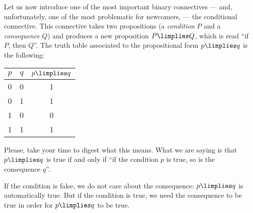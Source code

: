 \begin{para}
Let us now introduce one of the most important binary connectives --- and, unfortunately, one of the most problematic for newcomers, --- the conditional connective.
This connective takes two propositions (a \emph{condition} $P$ and a \emph{consequence} $Q$) and produces a new proposition $P\limplies Q$, which is read ``if $P$, then $Q$''.
The truth table associated to the propositional form $p\limplies q$  is the following:
\begin{center}
\begin{tabular}[]{|c|c||c|}
\hline $p$ & $q$ & $p\limplies q$ \\
\hline\hline 0 & 0 & 1 \\
\hline 0 & 1 & 1 \\
\hline 1 & 0 & 0 \\
\hline 1 & 1 & 1 \\
\hline
\end{tabular}
\end{center}
Please, take your time to digest what this means. What we are saying is that $p\limplies q$ is true if and only if ``if the condition $p$ is true, so is the consequence $q$''.

If the condition is false, we do not care about the consequence: $p\limplies q$ is automatically true.
But if the condition is true, we need the consequence to be true in order for $p\limplies q$ to be true.
\end{para}


